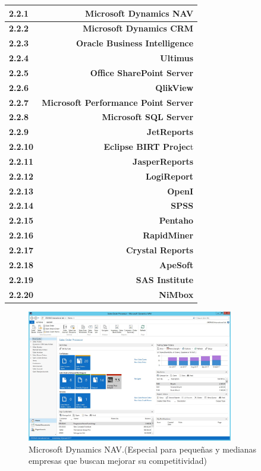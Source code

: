 \documentclass[a4paper,12pt,twocolumn]{article}
\begin{document}
\begin{center}
\begin{tabular}{|l|r|}\hline
\textbf{2.2.1} & \textbf{Microsoft Dynamics NAV}\\\hline
\textbf{2.2.2} & \textbf{Microsoft Dynamics CRM}\\\hline
\textbf{2.2.3} & \textbf{Oracle Business Intelligence}\\\hline
\textbf{2.2.4} & \textbf{Ultimus}\\\hline
\textbf{2.2.5} & \textbf{Office SharePoint Server}\\\hline
\textbf{2.2.6} & \textbf{QlikView}\\\hline
\textbf{2.2.7} & \textbf{Microsoft Performance Point Server}\\\hline
\textbf{2.2.8} & \textbf{Microsoft SQL Server}\\\hline
\textbf{2.2.9} & \textbf{JetReports}\\\hline
\textbf{2.2.10} & \textbf{Eclipse BIRT Projec}t\\\hline
\textbf{2.2.11} & \textbf{JasperReports}\\\hline
\textbf{2.2.12} & \textbf{LogiReport}\\\hline
\textbf{2.2.13} & \textbf{OpenI}\\\hline
\textbf{2.2.14} & \textbf{SPSS}\\\hline
\textbf{2.2.15} & \textbf{Pentaho}\\\hline
\textbf{2.2.16} & \textbf{RapidMiner}\\\hline
\textbf{2.2.17} & \textbf{Crystal Reports}\\\hline
\textbf{2.2.18} & \textbf{ApeSoft}\\\hline
\textbf{2.2.19} & \textbf{SAS Institute}\\\hline
\textbf{2.2.20} & \textbf{NiMbox}\\\hline
\end{tabular}
\end{center}

\begin{figure}[h!]
\centering
\includegraphics[width=9cm]{./Imagenes/BIimagen1}
\caption{\label{fig:01}Microsoft Dynamics NAV.(Especial para pequeñas y medianas empresas que buscan mejorar su competitividad)}
\end{figure}
\end{document}
